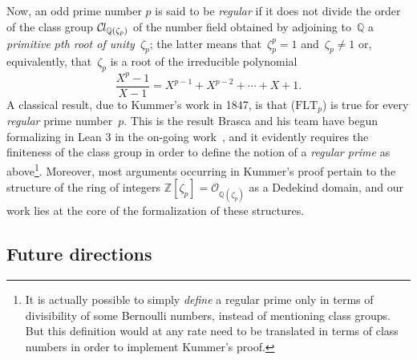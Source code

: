 \documentclass[sn-mathphys]{sn-jnl}%
\newcommand*{\OK}[1][K]{\mathcal{O}_{#1}}
\newcommand*{\Cl}{\mathcal{C}\kern-.075em l}
\newcommand*{\refFLT}[1]{($\mathrm{FLT}_{#1}$)}
\newcommand{\QQ}{\mathbb{Q}}
\renewcommand{\Z}{\mathbb{Z}}
\begin{document}
Now, an odd prime number $p$ is said to be \emph{regular} if it does not divide the order of the class group $\Cl_{\QQ(\zeta_p)}$ of the number field obtained by adjoining to~$\QQ$ a \emph{primitive $p$th root of unity}~$\zeta_p$; the latter means that~$\zeta_p^p=1$ and~$\zeta_p\neq 1$ or, equivalently, that~$\zeta_p$ is a root of the irreducible polynomial
\[
\frac{X^p-1}{X-1}=X^{p-1}+X^{p-2}+\cdots +X+1.
\]
A classical result, due to Kummer's work in 1847, is that \refFLT{p} is true for every \emph{regular} prime number~$p$. This is the result Brasca and his team have begun formalizing in Lean 3 in the on-going work~\cite{Bra21}, and it evidently requires the finiteness of the class group in order to define the notion of a \emph{regular prime} as above\footnote{It is actually possible to simply \emph{define} a regular prime only in terms of divisibility of some Bernoulli numbers, instead of mentioning class groups. But this definition would at any rate need to be translated in terms of class numbers in order to implement Kummer's proof.}. Moreover, most arguments occurring in Kummer's proof pertain to the structure of the ring of integers $\Z[\zeta_p]=\OK[\QQ(\zeta_p)]$ as a Dedekind domain, and our work lies at the core of the formalization of these structures.


\subsection{Future directions}\label{sec:future_directions}
\end{document}
